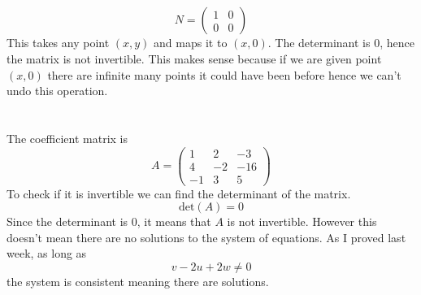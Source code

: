 \documentclass{article}
\begin{document}
\subsection{}
\[N = \begin{pmatrix}
    1&0 \\ 0&0
\end{pmatrix}\]
This takes any point \((x,y)\) and maps it to \((x,0)\). The determinant is 0, hence the matrix is not invertible. This makes sense because if we are given point \((x,0)\) there are infinite many points it could have been before hence we can't undo this operation.
\section{}
\subsection{}
The coefficient matrix is 
\[A = \begin{pmatrix}
    1&2&-3 \\ 4&-2&-16 \\ -1&3&5
\end{pmatrix}\]
To check if it is invertible we can find the determinant of the matrix.
\[\text{det}(A) = 0\]
Since the determinant is 0, it means that $A$ is not invertible. However this doesn't mean there are no solutions to the system of equations. As I proved last week, as long as 
\[v-2u+2w \neq 0\]
the system is consistent meaning there are solutions. 
\end{document}
